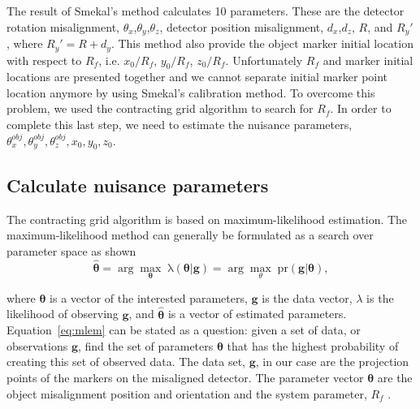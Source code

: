 The result of Smekal's method calculates 10 parameters.  These are the detector rotation misalignment, $\theta_x$,$\theta_y$,$\theta_z$, detector position misalignment, $d_x$,$d_z$, $R$, and $R_y'$, where $R_y' = R + d_y$.  This method also provide the object marker initial location with respect to $R_f$, i.e. $x_0/R_f$, $y_0/R_f$, $z_0/R_f$.  Unfortunately $R_f$ and marker initial locations are presented together and we cannot separate initial marker point location anymore by using Smekal's calibration method.  To overcome this problem, we used the contracting grid algorithm to search for $R_f$.  In order to complete this last step, we need to estimate the nuisance parameters, $\theta_x^{obj}, \theta_y^{obj}, \theta_z^{obj}, x_0, y_0, z_0$.


\subsection{Calculate nuisance parameters}
The contracting grid algorithm is based on maximum-likelihood estimation.  The maximum-likelihood method can generally be formulated as a search over parameter space as shown 
\begin{equation}
\label{eq:mlem}
\mathrm{\boldsymbol{\hat{\theta}}} = \arg\max_{\mathbf{\theta}} \; \mathrm{\lambda (\boldsymbol{\theta} | \mathbf{g})} = \arg\max_{\theta} \; \mathrm{pr( \mathbf{g}|\boldsymbol{\theta})},
\end{equation}

\noindent where $\boldsymbol{\theta}$ is a vector of the interested parameters, $\mathbf{g}$ is the data vector, $\lambda$ is the likelihood of observing $\mathbf{g}$, and $\boldsymbol{\hat{\theta}}$ is a vector of estimated parameters.  Equation~\ref{eq:mlem} can be stated as a question: given a set of data, or observations $\mathbf{g}$, find the set of parameters $\boldsymbol{\theta}$ that has the highest probability of creating this set of observed data.  The data set, $\mathbf{g}$, in our case are the projection points of the markers on the misaligned detector. The parameter vector $\boldsymbol{\theta}$ are the object misalignment position and orientation and the system parameter, $R_f$ .  

